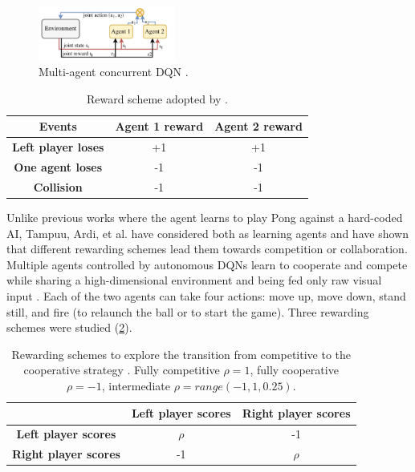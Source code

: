 \begin{figure}[ht]
  \centering
  \includegraphics[width=0.4\textwidth]{images/DQN_MAS.png}
  \caption{Multi-agent concurrent DQN \cite{diallo2017learning}.}
  \label{fig:dqnmas}
\end{figure}

\begin{table}[ht]
  \renewcommand{\arraystretch}{1.3}
  \caption{Reward scheme adopted by \cite{diallo2017learning}.}
  \label{tab:reward-scheme}
  \centering
  \begin{tabular}{@{}ccc@{}}
    \toprule
    \textbf{Events}            & \textbf{Agent 1 reward} & \textbf{Agent 2 reward} \\ \midrule
    \textbf{Left player loses} & +1                      & +1                      \\
    \textbf{One agent loses}   & -1                      & -1                      \\
    \textbf{Collision}         & -1                      & -1                      \\ \bottomrule
  \end{tabular}
\end{table}

Unlike previous works where the agent learns to play Pong against a hard-coded AI, 
Tampuu, Ardi, et al. \cite{tampuu2017multiagent} have considered both as learning agents and have shown that different rewarding schemes lead them towards competition or collaboration.
%
Multiple agents controlled by autonomous DQNs learn to cooperate and compete while sharing a high-dimensional environment and being fed only raw visual input \cite{tampuu2017multiagent}.
%
Each of the two agents can take four actions: 
move up, move down, stand still, and fire (to relaunch the ball or to start the game).
%
Three rewarding schemes were studied (\cref{tab:reward-scheme-2}).
%
\begin{table}[ht]
  \renewcommand{\arraystretch}{1.3}
  \caption{Rewarding schemes to explore the transition from competitive to the cooperative strategy \cite{tampuu2017multiagent}. Fully competitive $\rho = 1$, fully cooperative $\rho = -1$, intermediate $\rho = range(-1, 1, 0.25)$.}
  \label{tab:reward-scheme-2}
  \centering
  \begin{tabular}{@{}ccc@{}}
    \toprule
                                                   & \textbf{Left player scores} & \textbf{Right player scores} \\ \midrule
    \multicolumn{1}{c}{\textbf{Left player scores}} & $\rho$                   & -1                       \\ 
    \multicolumn{1}{c}{\textbf{Right player scores}} & -1                       & $\rho$                   \\ \bottomrule
  \end{tabular}
\end{table}

